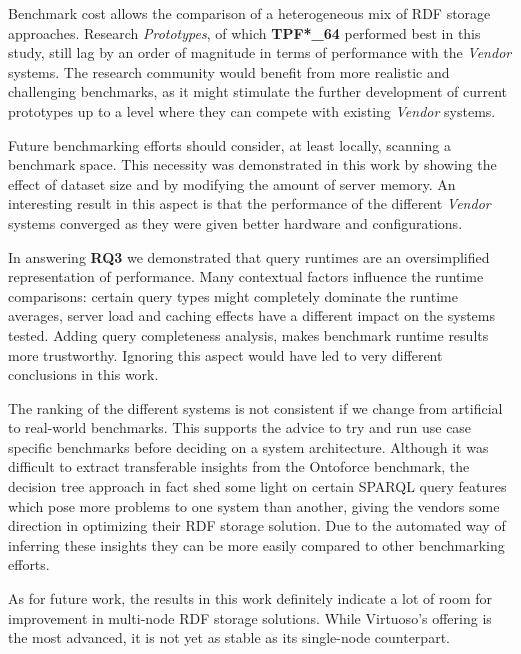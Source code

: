 \documentclass[twocolumn]{bmcart}%
\begin{document}
Benchmark cost allows the comparison of a heterogeneous mix of RDF storage approaches. Research \emph{Prototypes}, of which \textbf{TPF*\_64} performed best in this study, still lag by an order of magnitude in terms of performance with the \emph{Vendor} systems. The research community would benefit from more realistic and challenging benchmarks, as it might stimulate the further \mbox{development} of current prototypes up to a level where they can compete with existing \emph{Vendor} systems.

Future benchmarking efforts should consider, at least locally, scanning a benchmark space. This necessity was demonstrated in this work by showing the effect of dataset size and by modifying the amount of server memory. An interesting result in this aspect is that the performance of the different \emph{Vendor} systems converged as they were given better hardware and configurations.

In answering \textbf{RQ3} we demonstrated that query runtimes are an oversimplified representation of performance. Many contextual factors influence the runtime comparisons: certain query types might completely dominate the runtime averages, server load and caching effects have a different impact on the systems tested. Adding query completeness analysis, makes benchmark runtime results more trustworthy. Ignoring this aspect would have led to very different conclusions in this work.

The ranking of the different systems is not consistent if we change from artificial to real-world benchmarks. This supports the advice to try and run use case specific benchmarks before deciding on a system architecture. Although it was difficult to extract transferable insights from the Ontoforce benchmark, the decision tree approach in fact shed some light on certain SPARQL query features which pose more problems to one system than another, giving the vendors some direction in optimizing their RDF storage solution. Due to the automated way of inferring these insights they can be more easily compared to other benchmarking efforts.

As for future work, the results in this work definitely indicate a lot of room for improvement in multi-node RDF storage solutions. While Virtuoso's offering is the most advanced, it is not yet as stable as its single-node counterpart. 

\end{document}
